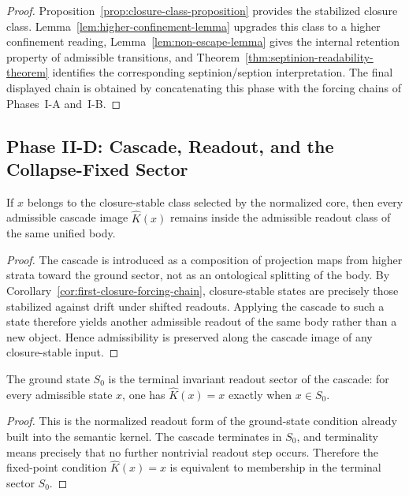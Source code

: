 \begin{proof}
Proposition~\ref{prop:closure-class-proposition} provides the stabilized
closure class. Lemma~\ref{lem:higher-confinement-lemma} upgrades this class to a
higher confinement reading, Lemma~\ref{lem:non-escape-lemma} gives the internal
retention property of admissible transitions, and
Theorem~\ref{thm:septinion-readability-theorem} identifies the corresponding
septinion/seption interpretation. The final displayed chain is obtained by
concatenating this phase with the forcing chains of Phases~I-A and~I-B.
\end{proof}


\subsection*{Phase II-D: Cascade, Readout, and the Collapse-Fixed Sector}

\begin{lemma}
\label{lem:cascade-admissibility-lemma}
If $x$ belongs to the closure-stable class selected by the normalized core,
then every admissible cascade image $\hat K(x)$ remains inside the admissible
readout class of the same unified body.
\end{lemma}

\begin{proof}
The cascade is introduced as a composition of projection maps from higher
strata toward the ground sector, not as an ontological splitting of the body.
By Corollary~\ref{cor:first-closure-forcing-chain}, closure-stable states are
precisely those stabilized against drift under shifted readouts. Applying the
cascade to such a state therefore yields another admissible readout of the same
body rather than a new object. Hence admissibility is preserved along the
cascade image of any closure-stable input.
\end{proof}

\begin{lemma}
\label{lem:terminal-ground-state-lemma}
The ground state $S_0$ is the terminal invariant readout sector of the cascade:
for every admissible state $x$, one has $\hat K(x)=x$ exactly when $x\in S_0$.
\end{lemma}

\begin{proof}
This is the normalized readout form of the ground-state condition already built
into the semantic kernel. The cascade terminates in $S_0$, and terminality
means precisely that no further nontrivial readout step occurs. Therefore the
fixed-point condition $\hat K(x)=x$ is equivalent to membership in the terminal
sector $S_0$.
\end{proof}


